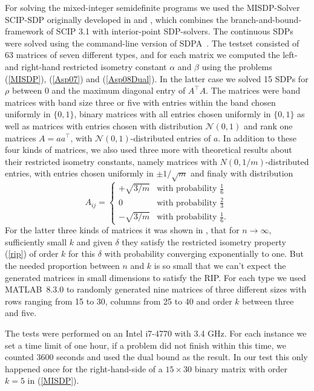 \documentclass[journal]{IEEEtran}
\newcommand{\T}{^{\top}}
\begin{document}
For solving the mixed-integer semidefinite programs we used the MISDP-Solver SCIP-SDP \cite{SCIP-SDP} originally developed in \cite{MS12} and \cite{Mar13}, which combines the branch-and-bound-framework of SCIP 3.1 \cite{SCIP} with 
interior-point SDP-solvers. The continuous SDPs were solved using the command-line version of SDPA~\cite{SDPA6,SDPA7}. The testset consisted of 63 matrices of seven 
different types, and for each matrix we computed the left- and right-hand restricted isometry constant $\alpha$ and $\beta$ using the problems (\ref{MISDP}), (\ref{Asp07}) and (\ref{Asp08Dual}). In the latter case we solved 15 
SDPs for $\rho$ between $0$ and the maximum diagonal entry of $A\T A$. The matrices were band matrices with band size three or five with entries within the band chosen uniformly in $\{0,1\}$, binary matrices with all entries chosen 
uniformly in $\{0,1\}$ as well as matrices with entries chosen with distribution $\mathcal{N}(0,1)$ and rank one matrices $A = aa\T$, with $\mathcal{N}(0,1)$-distributed entries of $a$. In addition to these four kinds of matrices, 
we also used three more with theoretical results about their restricted isometry constants, namely matrices with $N(0, 1/m)$-distributed entries, with entries chosen uniformly in $\pm 1/\sqrt{m}$ and finaly with distribution
\begin{equation}\nonumber
A_{ij} = \begin{cases} + \sqrt{3/m} & \text{with probability } \frac{1}{6} \\ 0 & \text{with probability } \frac{2}{3} \\ - \sqrt{3/m} & \text{with probability } \frac{1}{6}. \end{cases}
\end{equation}
For the latter three kinds of matrices it was shown in \cite{BDDW08}, that for $n \rightarrow \infty$, sufficiently small $k$ and given $\delta$ they satisfy the restricted isometry property (\ref{rip}) of order $k$ for this $\delta$
with probability converging exponentially to one. But the needed proportion between $n$ and $k$ is so small that we can't expect the generated matrices in small dimensions to satisfy the RIP. For each type we used \mbox{MATLAB 8.3.0} 
to randomly generated nine matrices of three different sizes with rows ranging from 15 to 30, columns from 25 to 40 and order $k$ between three and five.

The tests were performed on an Intel i7-4770 with 3.4 GHz. For each instance we set a time limit of one hour, if a problem did not finish within this time, we counted 3600 seconds and used the dual bound as the result. In our test this
only happened once for the right-hand-side of a $15 \times 30$ binary matrix with order $k=5$ in (\ref{MISDP}). 
\end{document}
